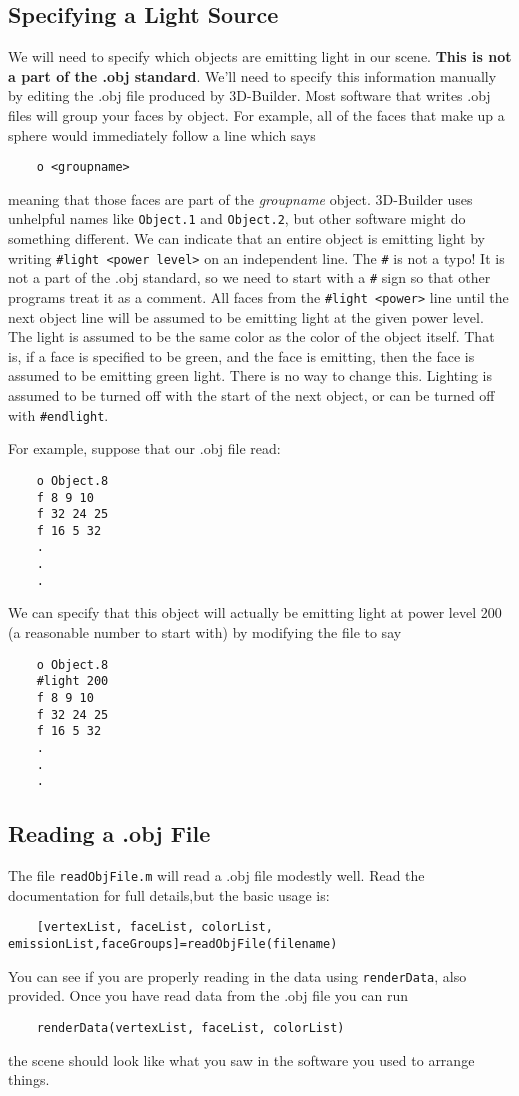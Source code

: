 \documentclass{article}
\begin{document}
\subsection*{Specifying a Light Source}
We will need to specify which objects are emitting light in our scene.  \textbf{This is not a part of the .obj standard}.  We'll need to specify this information manually by editing the .obj file produced by 3D-Builder.  Most software that writes .obj files will group your faces by object.  For example, all of the faces that make up a sphere would immediately follow a line which says\\
\begin{verbatim}
    o <groupname>    
\end{verbatim}
meaning that those faces are part of the \textit{groupname} object.  3D-Builder uses unhelpful names like \texttt{Object.1} and \texttt{Object.2}, but other software might do something different. We can indicate that an entire object is emitting light by writing \texttt{\#light <power level>} on an independent line. The \texttt{\#} is not a typo!  It is not a part of the .obj standard, so we need to start with a \texttt{\#} sign so that other programs treat it as a comment. All faces from the \texttt{\#light <power>} line until the next object line will be assumed to be emitting light at the given power level.  The light is assumed to be the same color as the color of the object itself.  That is, if a face is specified to be green, and the face is emitting, then the face is assumed to be emitting green light.  There is no way to change this.   Lighting is assumed to be turned off with the start of the next object, or can be turned off with \texttt{\#endlight}.  

For example, suppose that our .obj file read:
\begin{verbatim}
    o Object.8
    f 8 9 10
    f 32 24 25
    f 16 5 32
    . 
    . 
    .
\end{verbatim}
We can specify that this object will actually be emitting light at power level 200 (a reasonable number to start with) by modifying the file to say
\begin{verbatim}
    o Object.8
    #light 200
    f 8 9 10
    f 32 24 25
    f 16 5 32
    . 
    . 
    .
\end{verbatim}
\subsection*{Reading a .obj File}
The file \texttt{readObjFile.m} will read a .obj file modestly well.  Read the documentation for full details,but the basic usage is: 
\begin{verbatim}
    [vertexList, faceList, colorList, emissionList,faceGroups]=readObjFile(filename)
\end{verbatim}
You can see if you are properly reading in the data using \texttt{renderData}, also provided.  Once you have read data from the .obj file you can run 
\begin{verbatim}
    renderData(vertexList, faceList, colorList)
\end{verbatim}
the scene should look like what you saw in the software you used to arrange things. 
\end{document}
